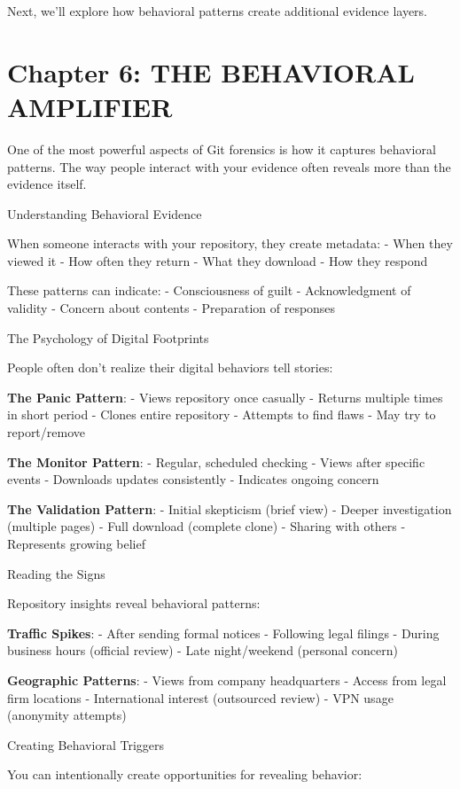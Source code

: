 Next, we'll explore how behavioral patterns create additional evidence
layers.

\section{Chapter 6: THE BEHAVIORAL
AMPLIFIER}\label{chapter-6-the-behavioral-amplifier}

One of the most powerful aspects of Git forensics is how it captures
behavioral patterns. The way people interact with your evidence often
reveals more than the evidence itself.

Understanding Behavioral Evidence

When someone interacts with your repository, they create metadata: -
When they viewed it - How often they return - What they download - How
they respond

These patterns can indicate: - Consciousness of guilt - Acknowledgment
of validity - Concern about contents - Preparation of responses

The Psychology of Digital Footprints

People often don't realize their digital behaviors tell stories:

\textbf{The Panic Pattern}: - Views repository once casually - Returns
multiple times in short period - Clones entire repository - Attempts to
find flaws - May try to report/remove

\textbf{The Monitor Pattern}: - Regular, scheduled checking - Views
after specific events - Downloads updates consistently - Indicates
ongoing concern

\textbf{The Validation Pattern}: - Initial skepticism (brief view) -
Deeper investigation (multiple pages) - Full download (complete clone) -
Sharing with others - Represents growing belief

Reading the Signs

Repository insights reveal behavioral patterns:

\textbf{Traffic Spikes}: - After sending formal notices - Following
legal filings - During business hours (official review) - Late
night/weekend (personal concern)

\textbf{Geographic Patterns}: - Views from company headquarters - Access
from legal firm locations - International interest (outsourced review) -
VPN usage (anonymity attempts)

Creating Behavioral Triggers

You can intentionally create opportunities for revealing behavior:

